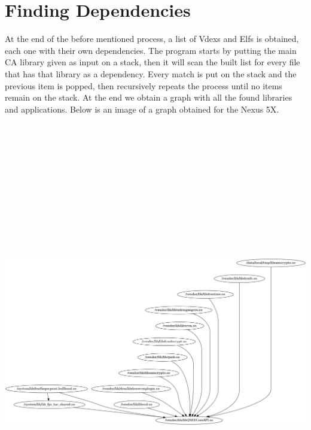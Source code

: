 \documentclass[a4paper,11pt,oneside]{report}
\begin{document}
\section{Finding Dependencies}
At the end of the before mentioned process, a list of Vdexs and Elfs is obtained, each one with
their own dependencies. The program starts by putting the main CA library given
as input on a stack, then it will scan the built list for every file that has
that library as a dependency. Every match is put on the stack and the previous
item is popped, then recursively repeats the
process until no items remain on the stack. At the end we obtain
a graph with all the found libraries and applications. Below is an image
of a graph obtained for the Nexus 5X.
\includegraphics[width=16cm, height=20cm]{figures/nexus5x.png}
\end{document}
